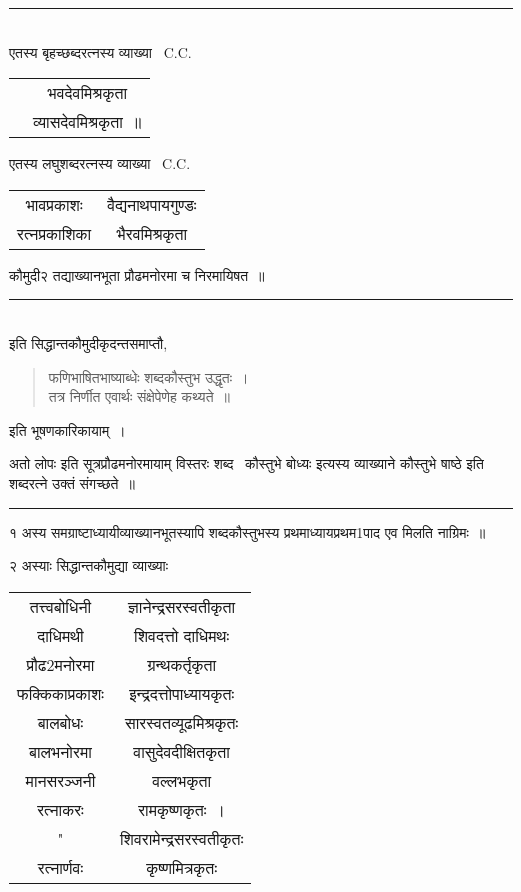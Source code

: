\documentclass[11pt, openany]{book}
\begin{document}
\begin{multicols}{2}
\noindent
\rule{1\linewidth}{0.5pt}\\

 एतस्य बृहच्छब्दरत्नस्य व्याख्या \textendash\ C.C. 

\begin{tabular}{c c}
& भवदेवमिश्रकृता \\
& व्यासदेवमिश्रकृता~॥ 
\end{tabular}

 एतस्य लघुशब्दरत्नस्य व्याख्या \textendash\ C.C. 

\begin{tabular}{c c}
भावप्रकाशः &वैद्यनाथपायगुण्डः \\
रत्नप्रकाशिका& भैरवमिश्रकृता 
\end{tabular}

\columnbreak

\noindent
कौमुदी२ तद्याख्यानभूता प्रौढमनोरमा च निरमायिषत~॥

\noindent
\rule{1\linewidth}{0.5pt}\\

इति सिद्धान्तकौमुदीकृदन्तसमाप्तौ, 

\begin{quote}
{\qt फणिभाषितभाष्याब्धेः शब्दकौस्तुभ उद्धृतः~।\\
तत्र निर्णीत एवार्थः संक्षेपेणेह कथ्यते~॥}
\end{quote}

\noindent
इति भूषणकारिकायाम्~। 

{\qt अतो लोपः} इति सूत्रप्रौढमनोरमायाम् {\qt विस्तरः शब्द \textendash\ कौस्तुभे बोध्यः} इत्यस्य व्याख्याने {\qt कौस्तुभे षाष्ठे} इति शब्दरत्ने उक्तं संगच्छते~॥

\begin{center}
\rule{0.2\linewidth}{0.5pt}
\end{center}

१ अस्य समग्राष्टाध्यायीव्याख्यानभूतस्यापि शब्दकौस्तुभस्य प्रथमाध्यायप्रथम1पाद एव मिलति नाग्रिमः~॥

२ अस्याः सिद्धान्तकौमुद्या व्याख्याः \textendash\ 

\begin{tabular}{c c}
तत्त्वबोधिनी& ज्ञानेन्द्रसरस्वतीकृता \\
दाधिमथी &शिवदत्तो दाधिमथः \\
प्रौढ2मनोरमा& ग्रन्थकर्तृकृता \\
फक्किकाप्रकाशः &इन्द्रदत्तोपाध्यायकृतः \\
बालबोधः &सारस्वतव्यूढमिश्रकृतः \\
बालभनोरमा &वासुदेवदीक्षितकृता \\
मानसरञ्जनी& वल्लभकृता \\
रत्नाकरः &रामकृष्णकृतः~।\\
"& शिवरामेन्द्रसरस्वतीकृतः \\
रत्नार्णवः &कृष्णमित्रकृतः
\end{tabular}


\end{multicols}
\end{document}
